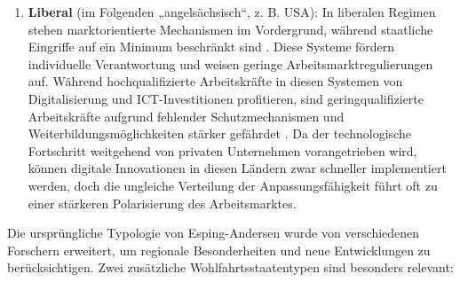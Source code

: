 \begin{enumerate}
    \item \textbf{Liberal} (im Folgenden „angelsächsisch“, z. B. USA): In liberalen Regimen 
    stehen marktorientierte Mechanismen im Vordergrund, während staatliche Eingriffe auf 
    ein Minimum beschränkt sind \parencite[vgl.][S. 27]{espingandersen1990thethree}. Diese 
    Systeme fördern individuelle Verantwortung und weisen geringe Arbeitsmarktregulierungen 
    auf. Während hochqualifizierte Arbeitskräfte in diesen Systemen von Digitalisierung und 
    \ac{ICT}-Investitionen profitieren, sind geringqualifizierte Arbeitskräfte aufgrund 
    fehlender Schutzmechanismen und Weiterbildungsmöglichkeiten stärker gefährdet 
    \parencite[vgl.][S. 12–13]{goodin1999thereal}. Da der technologische Fortschritt 
    weitgehend von privaten Unternehmen vorangetrieben wird, können digitale Innovationen 
    in diesen Ländern zwar schneller implementiert werden, doch die ungleiche Verteilung 
    der Anpassungsfähigkeit führt oft zu einer stärkeren Polarisierung des Arbeitsmarktes. 

\end{enumerate}

Die ursprüngliche Typologie von Esping-Andersen wurde von verschiedenen Forschern 
erweitert, um regionale Besonderheiten und neue Entwicklungen zu berücksichtigen. Zwei 
zusätzliche Wohlfahrtsstaatentypen sind besonders relevant:


